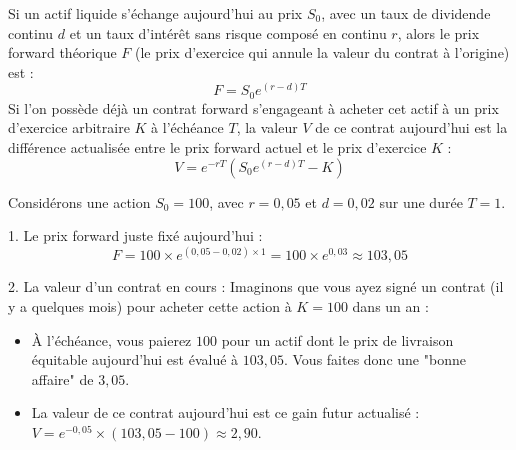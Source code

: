 \begin{theorembox}
Si un actif liquide s'échange aujourd'hui au prix $S_0$, avec un taux de dividende continu $d$ et un taux d'intérêt sans risque composé en continu $r$, alors le prix forward théorique $F$ (le prix d'exercice qui annule la valeur du contrat à l'origine) est :
\begin{equation}
    \label{eq:fsec2-forward_theorique}
    F = S_0 e^{(r-d)T}
\end{equation}
Si l'on possède déjà un contrat forward s'engageant à acheter cet actif à un prix d'exercice arbitraire $K$ à l'échéance $T$, la valeur $V$ de ce contrat aujourd'hui est la différence actualisée entre le prix forward actuel et le prix d'exercice $K$ :
\begin{equation}
    \label{eq:fsec2-forward_valeur}
    V = e^{-rT} (S_0 e^{(r-d)T} - K)
\end{equation}
\end{theorembox}

\begin{examplebox}
Considérons une action $S_0 = 100$, avec $r = 0,05$ et $d = 0,02$ sur une durée $T = 1$.

1. Le prix forward juste fixé aujourd'hui :
\begin{equation}
    \label{eq:fsec2-ex_forward_calc}
    F = 100 \times e^{(0,05 - 0,02) \times 1} = 100 \times e^{0,03} \approx 103,05
\end{equation}

2. La valeur d'un contrat en cours :
Imaginons que vous ayez signé un contrat (il y a quelques mois) pour acheter cette action à $K = 100$ dans un an :
\begin{itemize}[label=$\rightarrow$]
    \item À l'échéance, vous paierez $100$ pour un actif dont le prix de livraison équitable aujourd'hui est évalué à $103,05$. Vous faites donc une "bonne affaire" de $3,05$.
    \item La valeur de ce contrat aujourd'hui est ce gain futur actualisé : 
    $V = e^{-0,05} \times (103,05 - 100) \approx 2,90$.
\end{itemize}
\end{examplebox}

